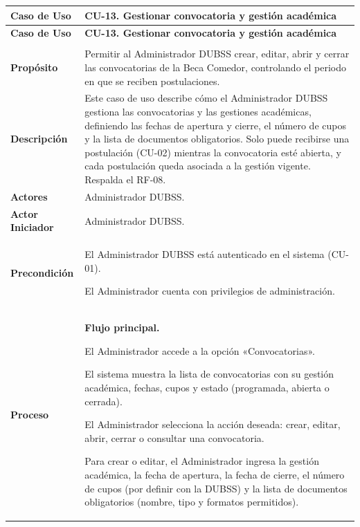 \begin{longtable}{>{\raggedright\arraybackslash}p{2.9cm} >{\raggedright\arraybackslash}p{12.6cm}}
\toprule
\textbf{Caso de Uso} & \textbf{CU-13. Gestionar convocatoria y gestión académica} \\
\midrule
\endfirsthead
\toprule
\textbf{Caso de Uso} & \textbf{CU-13. Gestionar convocatoria y gestión académica} \\
\midrule
\endhead
\endfoot
\bottomrule
\multicolumn{2}{l}{\textit{Nota.} Elaboración propia.} \\
\endlastfoot
\textbf{Propósito} & Permitir al Administrador DUBSS crear, editar, abrir y cerrar las convocatorias de la Beca Comedor, controlando el periodo en que se reciben postulaciones. \\
\midrule
\textbf{Descripción} & Este caso de uso describe cómo el Administrador DUBSS gestiona las convocatorias y las gestiones académicas, definiendo las fechas de apertura y cierre, el número de cupos y la lista de documentos obligatorios. Solo puede recibirse una postulación (CU-02) mientras la convocatoria esté abierta, y cada postulación queda asociada a la gestión vigente. Respalda el RF-08. \\
\midrule
\textbf{Actores} & Administrador DUBSS. \\
\midrule
\textbf{Actor Iniciador} & Administrador DUBSS. \\
\midrule
\textbf{Precondición} & \vspace{-\baselineskip}\begin{cuvin}
    \item El Administrador DUBSS está autenticado en el sistema (CU-01).
    \item El Administrador cuenta con privilegios de administración.
\end{cuvin} \\
\midrule
\textbf{Proceso} & \textbf{Flujo principal.}
\begin{cupasos}
    \item El Administrador accede a la opción «Convocatorias».
    \item El sistema muestra la lista de convocatorias con su gestión académica, fechas, cupos y estado (programada, abierta o cerrada).
    \item El Administrador selecciona la acción deseada: crear, editar, abrir, cerrar o consultar una convocatoria.
    \item Para crear o editar, el Administrador ingresa la gestión académica, la fecha de apertura, la fecha de cierre, el número de cupos (por definir con la DUBSS) y la lista de documentos obligatorios (nombre, tipo y formatos permitidos).

\end{cupasos}
\end{longtable}
